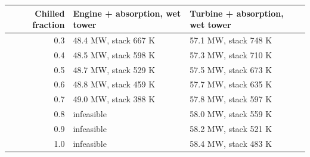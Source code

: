 \begingroup\small\renewcommand{\arraystretch}{1.1}
\begin{tabular}{@{}rll@{}}
\toprule
Chilled fraction & Engine + absorption, wet tower & Turbine + absorption, wet tower \\
\midrule
0.3 & 48.4 MW, stack 667 K & 57.1 MW, stack 748 K \\
0.4 & 48.5 MW, stack 598 K & 57.3 MW, stack 710 K \\
0.5 & 48.7 MW, stack 529 K & 57.5 MW, stack 673 K \\
0.6 & 48.8 MW, stack 459 K & 57.7 MW, stack 635 K \\
0.7 & 49.0 MW, stack 388 K & 57.8 MW, stack 597 K \\
0.8 & infeasible & 58.0 MW, stack 559 K \\
0.9 & infeasible & 58.2 MW, stack 521 K \\
1.0 & infeasible & 58.4 MW, stack 483 K \\
\bottomrule
\end{tabular}\endgroup
